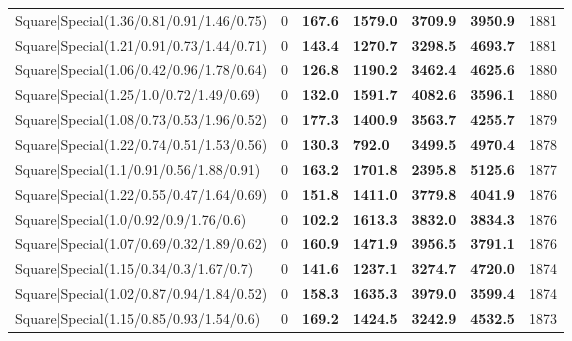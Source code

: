 \begin{tabular}{lrllllr}
 Square|Special(1.36/0.81/0.91/1.46/0.75)                      &             0   & \textbf{167.6} & \textbf{1579.0} & \textbf{3709.9} & \textbf{3950.9} &         1881 \\
 Square|Special(1.21/0.91/0.73/1.44/0.71)                      &             0   & \textbf{143.4} & \textbf{1270.7} & \textbf{3298.5} & \textbf{4693.7} &         1881 \\
 Square|Special(1.06/0.42/0.96/1.78/0.64)                      &             0   & \textbf{126.8} & \textbf{1190.2} & \textbf{3462.4} & \textbf{4625.6} &         1880 \\
 Square|Special(1.25/1.0/0.72/1.49/0.69)                       &             0   & \textbf{132.0} & \textbf{1591.7} & \textbf{4082.6} & \textbf{3596.1} &         1880 \\
 Square|Special(1.08/0.73/0.53/1.96/0.52)                      &             0   & \textbf{177.3} & \textbf{1400.9} & \textbf{3563.7} & \textbf{4255.7} &         1879 \\
 Square|Special(1.22/0.74/0.51/1.53/0.56)                      &             0   & \textbf{130.3} & \textbf{792.0}  & \textbf{3499.5} & \textbf{4970.4} &         1878 \\
 Square|Special(1.1/0.91/0.56/1.88/0.91)                       &             0   & \textbf{163.2} & \textbf{1701.8} & \textbf{2395.8} & \textbf{5125.6} &         1877 \\
 Square|Special(1.22/0.55/0.47/1.64/0.69)                      &             0   & \textbf{151.8} & \textbf{1411.0} & \textbf{3779.8} & \textbf{4041.9} &         1876 \\
 Square|Special(1.0/0.92/0.9/1.76/0.6)                         &             0   & \textbf{102.2} & \textbf{1613.3} & \textbf{3832.0} & \textbf{3834.3} &         1876 \\
 Square|Special(1.07/0.69/0.32/1.89/0.62)                      &             0   & \textbf{160.9} & \textbf{1471.9} & \textbf{3956.5} & \textbf{3791.1} &         1876 \\
 Square|Special(1.15/0.34/0.3/1.67/0.7)                        &             0   & \textbf{141.6} & \textbf{1237.1} & \textbf{3274.7} & \textbf{4720.0} &         1874 \\
 Square|Special(1.02/0.87/0.94/1.84/0.52)                      &             0   & \textbf{158.3} & \textbf{1635.3} & \textbf{3979.0} & \textbf{3599.4} &         1874 \\
 Square|Special(1.15/0.85/0.93/1.54/0.6)                       &             0   & \textbf{169.2} & \textbf{1424.5} & \textbf{3242.9} & \textbf{4532.5} &         1873 \\

\end{tabular}
